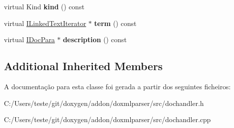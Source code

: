 \begin{DoxyCompactItemize}
\item 
\hypertarget{class_variable_list_entry_handler_af8e62c8a81ddf2283205cc8955de50eb}{virtual Kind {\bfseries kind} () const }\label{class_variable_list_entry_handler_af8e62c8a81ddf2283205cc8955de50eb}

\item 
\hypertarget{class_variable_list_entry_handler_a29510d368f0210b5cda6a70d0ec2d8f7}{virtual \hyperlink{class_i_linked_text_iterator}{I\-Linked\-Text\-Iterator} $\ast$ {\bfseries term} () const }\label{class_variable_list_entry_handler_a29510d368f0210b5cda6a70d0ec2d8f7}

\item 
\hypertarget{class_variable_list_entry_handler_a286592464b720cd61400fa22215a35c5}{virtual \hyperlink{class_i_doc_para}{I\-Doc\-Para} $\ast$ {\bfseries description} () const }\label{class_variable_list_entry_handler_a286592464b720cd61400fa22215a35c5}

\end{DoxyCompactItemize}
\subsection*{Additional Inherited Members}


A documentação para esta classe foi gerada a partir dos seguintes ficheiros\-:\begin{DoxyCompactItemize}
\item 
C\-:/\-Users/teste/git/doxygen/addon/doxmlparser/src/dochandler.\-h\item 
C\-:/\-Users/teste/git/doxygen/addon/doxmlparser/src/dochandler.\-cpp\end{DoxyCompactItemize}
